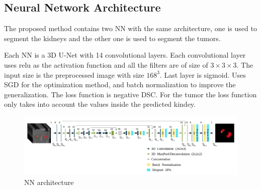 \documentclass{article}
\begin{document}
\subsection{Neural Network Architecture}
\label{sec:nnarc}
The proposed method contains two NN with the same architecture, one is used to segment the kidneys and the other one 
is used to segment the tumors. 

Each NN is a 3D U-Net with 14 convolutional layers. Each convolutional layer uses relu as the activation function and
all the filters are of size of $3\times 3 \times 3$. The input size is the preprocessed image with size $168^3$. 
Last layer is sigmoid.
Uses SGD for the optimization method, and batch normalization to improve the generalization. 
The loss function is negative DSC.
For the tumor the loss function only takes into account the values inside the predicted kindey. 

\begin{figure}[h]
    \centering
    \includegraphics[totalheight=.20\textheight]{imgs/nn.png}
    \caption{NN architecture }
    \label{fig:mobile1}
\end{figure}


\end{document}

